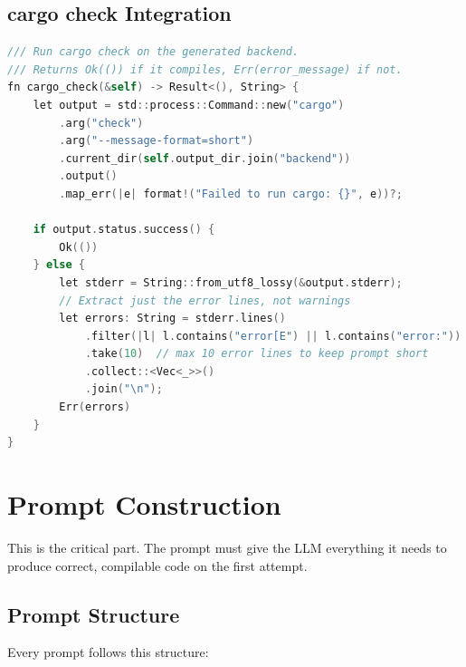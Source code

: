 \documentclass[11pt,a4paper]{article}
\begin{document}
\subsection{cargo check Integration}

\begin{lstlisting}[language=C]
/// Run cargo check on the generated backend.
/// Returns Ok(()) if it compiles, Err(error_message) if not.
fn cargo_check(&self) -> Result<(), String> {
    let output = std::process::Command::new("cargo")
        .arg("check")
        .arg("--message-format=short")
        .current_dir(self.output_dir.join("backend"))
        .output()
        .map_err(|e| format!("Failed to run cargo: {}", e))?;

    if output.status.success() {
        Ok(())
    } else {
        let stderr = String::from_utf8_lossy(&output.stderr);
        // Extract just the error lines, not warnings
        let errors: String = stderr.lines()
            .filter(|l| l.contains("error[E") || l.contains("error:"))
            .take(10)  // max 10 error lines to keep prompt short
            .collect::<Vec<_>>()
            .join("\n");
        Err(errors)
    }
}
\end{lstlisting}

\section{Prompt Construction}

This is the critical part. The prompt must give the LLM everything
it needs to produce correct, compilable code on the first attempt.

\subsection{Prompt Structure}

Every prompt follows this structure:
\end{document}
